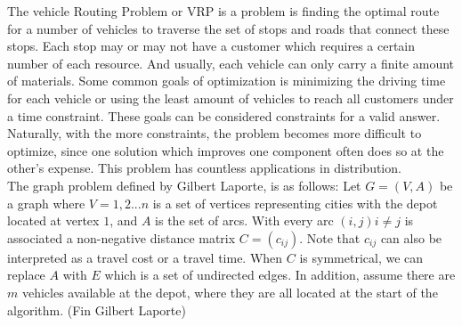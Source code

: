 \documentclass[letterpaper,11pt]{article}
\begin{document}
The vehicle Routing Problem or VRP is a problem is finding the optimal route for a number of vehicles to traverse the set of stops and roads that connect these stops. Each stop may or may not have a customer which requires a certain number of each resource. And usually, each vehicle can only carry a finite amount of materials. Some common goals of optimization is minimizing the driving time for each vehicle or using the least amount of vehicles to reach all customers under a time constraint. These goals can be considered constraints for a valid answer. Naturally, with the more constraints, the problem becomes more difficult to optimize, since one solution which improves one component often does so at the other’s expense.  This problem has countless applications in distribution.\\

The graph problem defined by Gilbert Laporte, is as follows: Let $G=(V,A)$ be a graph where $V={1,2...n}$ is a set of vertices representing cities with the depot located at vertex $1$, and $A$ is the set of arcs. With every arc $(i,j) i \neq j$ is associated a non-negative distance matrix $C = (c_{ij})$. Note that $c_{ij}$ can also be interpreted as a travel cost or a travel time. When $C$ is symmetrical, we can replace $A$ with $E$ which is a set of undirected edges.  In addition, assume there are $m$ vehicles available at the depot, where they are all located at the start of the algorithm. (Fin Gilbert Laporte)

 
\end{document}

